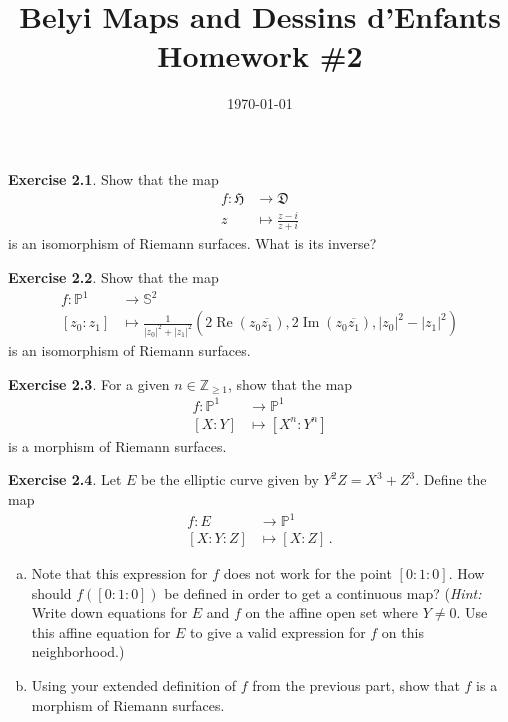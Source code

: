 \documentclass[12pt]{amsart}
\newenvironment{exolab}[1]
{\noindent\textbf{Exercise #1}.}
{\vskip 6pt}
\theoremstyle{remark}
\newcommand{\D}{\mathfrak D}
\renewcommand{\H}{\mathfrak H}
\renewcommand{\P}{\mathbb P}
\renewcommand{\SS}{\mathbb S}
\newcommand{\Z}{\mathbb Z}
\renewcommand{\Im}{\operatorname{Im}}
\renewcommand{\Re}{\operatorname{Re}}
\begin{document}
\title{Belyi Maps and Dessins d'Enfants \\ Homework \#2}
\date{\today}


\maketitle

\begin{exolab}{2.1}
  Show that the map
  \begin{align*}
    f: \H &\to \D\\
    z &\mapsto \frac{z-i}{z+i}
  \end{align*}
  is an isomorphism of Riemann surfaces. What is its inverse?
\end{exolab}

\begin{exolab}{2.2}
  Show that the map
  \begin{align*}
    f: \P^1 &\to \SS^2\\
    [z_0 : z_1] &\mapsto \frac{1}{|z_0|^2 + |z_1|^2} \left(2\Re(z_0 \overline{z_1}), 2 \Im(z_0 \overline{z_1}), |z_0|^2 - |z_1|^2 \right)
  \end{align*}
  is an isomorphism of Riemann surfaces.
\end{exolab}

\begin{exolab}{2.3}
  For a given $n \in \Z_{\geq 1}$, show that the map
  \begin{align*}
    f: \P^1 &\to \P^1\\
    [X:Y] &\mapsto [X^n : Y^n]
  \end{align*}
  is a morphism of Riemann surfaces.
\end{exolab}

\begin{exolab}{2.4}
  Let $E$ be the elliptic curve given by $Y^2 Z = X^3 + Z^3$. Define the map
  \begin{align*}
    f: E &\to \P^1\\
    [X:Y:Z] &\mapsto [X:Z] \, .
  \end{align*}
  \begin{enumerate}[(a)]
    \item 
      Note that this expression for $f$ does not work for the point $[0:1:0]$. How should $f([0:1:0])$ be defined in order to get a continuous map? (\textit{Hint:} Write down equations for $E$ and $f$ on the affine open set where $Y \neq 0$. Use this affine equation for $E$ to give a valid expression for $f$ on this neighborhood.)
    \item
      Using your extended definition of $f$ from the previous part, show that $f$ is a morphism of Riemann surfaces.
  \end{enumerate}
\end{exolab}
\end{document}
